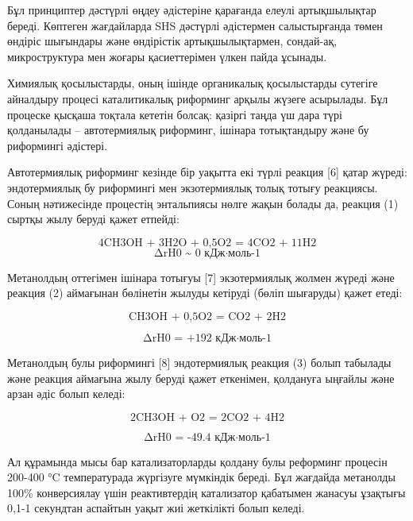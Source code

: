 \begin{multicols}{2}
Бұл принциптер дәстүрлі өңдеу әдістеріне қарағанда елеулі артықшылықтар
береді. Көптеген жағдайларда SHS дәстүрлі әдістермен салыстырғанда төмен
өндіріс шығындары және өндірістік артықшылықтармен, сондай-ақ,
микроструктура мен жоғары қасиеттерімен үлкен пайда ұсынады.

Химиялық қосылыстарды, оның ішінде органикалық қосылыстарды сутегіге
айналдыру процесі каталитикалық риформинг арқылы жүзеге асырылады. Бұл
процеске қысқаша тоқтала кететін болсақ: қазіргі таңда үш дара түрі
қолданылады -- автотермиялық риформинг, ішінара тотықтандыру және бу
риформингі әдістері.

Автотермиялық риформинг кезінде бір уақытта екі түрлі реакция {[}6{]}
қатар жүреді: эндотермиялық бу риформингі мен экзотермиялық толық тотығу
реакциясы. Соның нәтижесінде процестің энтальпиясы нөлге жақын болады
да, реакция (1) сыртқы жылу беруді қажет етпейді:

\begin{equation}
\text{4CH3OH + 3H2O + 0,5O2 = 4CO2 + 11H2}
\end{equation}
\begin{equation*}
\text{∆rH0 \textasciitilde{} 0 кДж·моль-1}
\end{equation*}

Метанолдың оттегімен ішінара тотығуы {[}7{]} экзотермиялық жолмен жүреді
және реакция (2) аймағынан бөлінетін жылуды кетіруді (бөліп шығаруды)
қажет етеді:

\begin{equation}
\text{CH3OH + 0,5O2 = CO2 + 2H2}
\end{equation}

\begin{equation*}
\text{∆rH0 = +192 кДж·моль-1}
\end{equation*}

Метанолдың булы риформингі {[}8{]} эндотермиялық реакция (3) болып
табылады және реакция аймағына жылу беруді қажет еткенімен, қолдануға
ыңғайлы және арзан әдіс болып келеді:

\begin{equation}
\text{2CH3OH + O2 = 2CO2 + 4H2}
\end{equation}

\begin{equation*}
\text{∆rH0 = -49.4 кДж·моль-1}
\end{equation*}

Ал құрамында мысы бар катализаторларды қолдану булы реформинг процесін
200-400 °C температурада жүргізуге мүмкіндік береді. Бұл жағдайда
метанолды 100\% конверсиялау үшін реактивтердің катализатор қабатымен
жанасуы ұзақтығы 0,1-1 секундтан аспайтын уақыт жиі жеткілікті болып
келеді.


\end{multicols}
